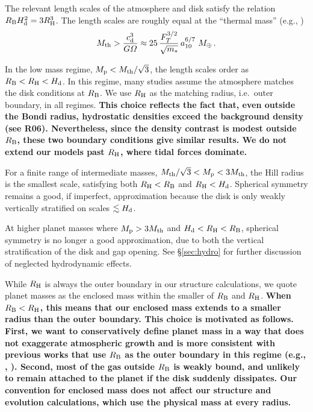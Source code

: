 \documentclass[apj, numberedappendix]{emulateapj}
\newcommand{\RB}{R_{\rm B}}
\newcommand{\RH}{R_{\rm H}}
\newcommand{\pla}{_{\rm p}}
\newcommand{\di}{_{\rm d}}
\newcommand{\aun}[1]{ a_{#1} }
\begin{document}
The relevant length scales of the atmosphere and disk satisfy the relation $\RB H\di^2 = 3 R_{\rm H}^3$.  The length scales are roughly equal at the ``thermal mass'' (e.g., \citealt{menou04})
\begin{equation}\label{eq:Mth}
M_{\rm th} > {c\di^{3} \over G \varOmega} \approx 25 \, {F_T^{3/2} \over \sqrt{m_\ast} } \, \aun{10}^{6/7}~ M_\oplus \, .
\end{equation} 

In the low mass regime, $M\pla < M_{\rm th}/\sqrt{3}$, the length scales order as $\RB< \RH<H\di$.  In this regime, many studies assume the atmosphere matches the disk conditions at $\RB$.  We use $\RH$ as the matching radius, i.e.\ outer boundary, in all regimes.  
\textbf{This choice reflects the fact that, even outside the Bondi radius, hydrostatic densities exceed the background density (see R06). Nevertheless, since the density contrast is modest outside $\RB$, these two boundary conditions give similar results.  We do not extend our models past $\RH$, where tidal forces dominate. }


For a finite range of intermediate masses, $M_{\rm th}/\sqrt{3} < M\pla < 3 M_{\rm th}$, the Hill radius is the smallest scale, satisfying both $\RH < \RB$ and $\RH < H\di$.  Spherical symmetry remains a good, if imperfect, approximation because the disk is only weakly vertically stratified on  scales $\lesssim H\di$.  

At higher planet masses where $M\pla > 3 M_{\rm th}$ and $H\di < \RH < \RB$, spherical symmetry is no longer a good approximation, due to both the vertical stratification of the disk and gap opening.  See \S\ref{sec:hydro} for further discussion of neglected hydrodynamic effects.

While $\RH$ is always the outer boundary in our structure calculations, we quote planet masses as the enclosed mass within the smaller of $\RB$ and $\RH$. \textbf{When $\RB < \RH$, this means that our enclosed mass extends to a smaller radius than the outer boundary.  This choice is motivated as follows.  First, we want to conservatively define planet mass in a way that does not exaggerate atmospheric growth and is more consistent with previous works that use $\RB$ as the outer boundary in this regime (e.g., \citealt{ikoma00}, \citealt{pollack96}).  Second, most of the gas outside $\RB$ is weakly bound, and unlikely to remain attached to the planet if the disk suddenly dissipates.  Our convention for enclosed mass does not affect our structure and evolution calculations, which use the physical mass at every radius.}
\end{document}
